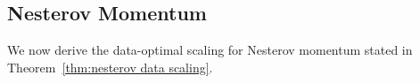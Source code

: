 
\subsection{Nesterov Momentum}
\label{app:nag_scaling_analysis}

We now derive the data-optimal scaling for Nesterov momentum stated in
Theorem~\ref{thm:nesterov data scaling}.


